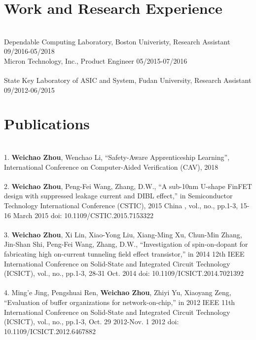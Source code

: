 \section*{Work and Research Experience}\vspace{-4ex}
\hrulefill\\
Dependable Computing Laboratory, Boston Univeristy, Research Assistant\\
\hspace*{\fill} 09/2016-05/2018\\ 
Micron Technology, Inc., Product Engineer\hspace*{\fill} 05/2015-07/2016\\\\
State Key Laboratory of ASIC and System, Fudan University, Research Assistant\\
\hspace*{\fill} 09/2012-06/2015\\



\section*{Publications}\vspace{-4ex}
\hrulefill\\
1.	\textbf{Weichao Zhou}, Wenchao Li, ``Safety-Aware Apprenticeship Learning'', International Conference on Computer-Aided Verification (CAV), 2018\\\\ 
2.	\textbf{Weichao Zhou}, Peng-Fei Wang, Zhang, D.W., ``A sub-10nm U-shape FinFET design with suppressed leakage current and DIBL effect,'' in Semiconductor Technology International Conference (CSTIC), 2015 China , vol., no., pp.1-3, 15-16 March 2015 doi: 10.1109/CSTIC.2015.7153322\\\\
3.	\textbf{Weichao Zhou}, Xi Lin, Xiao-Yong Liu, Xiang-Ming Xu, Chun-Min Zhang, Jin-Shan Shi, Peng-Fei Wang, Zhang, D.W., ``Investigation of spin-on-dopant for fabricating high on-current tunneling field effect transistor,'' in 2014 12th IEEE International Conference on Solid-State and Integrated Circuit Technology (ICSICT),  vol., no., pp.1-3, 28-31 Oct. 2014 doi: 10.1109/ICSICT.2014.7021392\\\\
4.	Ming'e Jing, Pengshuai Ren, \textbf{Weichao Zhou}, Zhiyi Yu, Xiaoyang Zeng, ``Evaluation of buffer organizations for network-on-chip,'' in 2012 IEEE 11th International Conference on Solid-State and Integrated Circuit Technology (ICSICT), vol., no., pp.1-3, Oct. 29 2012-Nov. 1 2012 doi: 10.1109/ICSICT.2012.6467882\\



%

